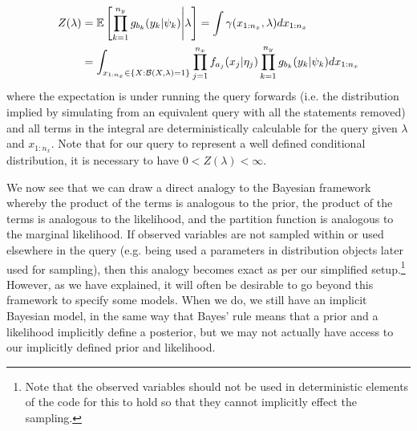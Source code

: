 \begin{align}
\label{eq:probprog:mod}
Z(\lambda) &= \mathbb{E} \left[ \prod_{k=1}^{n_y} g_{b_k}(y_k | \psi_k) \middle| \lambda \right] = \int \gamma(x_{1:n_x},\lambda) dx_{1:n_x}\nonumber\\
&= \int_{x_{1:n_x} \in \{X : \mathcal{B}(X,\lambda)=1\}} 
\prod_{j=1}^{n_x} f_{a_j}(x_j | \eta_j) \prod_{k=1}^{n_y} g_{b_k}(y_k | \psi_k) dx_{1:n_x}
\end{align}
where the expectation is under running the query forwards (i.e. the distribution implied by simulating
from an equivalent query with all the \observe statements removed) and 
all terms in the integral are deterministically calculable for the query given $\lambda$ and $x_{1:n_x}$.
Note that for our query to represent a well defined conditional distribution, it is necessary to have
$0<Z(\lambda)<\infty$.

We now see that we can draw a direct analogy to the Bayesian framework whereby the product of the
\sample terms is analogous to the prior, the product of the \observe terms is analogous to the
likelihood, and the partition function is analogous to the marginal likelihood.  If observed variables
are not sampled within or used elsewhere in the query (e.g. being used a parameters in distribution objects
later used for sampling), then this analogy becomes exact as per our simplified setup.\footnote{Note that the
	observed variables should not be used in deterministic elements of the code for this to hold so that they
	cannot implicitly effect the sampling.}  However, as we have explained, it will often be desirable to go
beyond this framework to specify some models.  When we do, we still have an implicit Bayesian model, in the
same way that Bayes' rule means that a prior and a likelihood implicitly define a posterior, but we may not
actually have access to our implicitly defined prior and likelihood.

